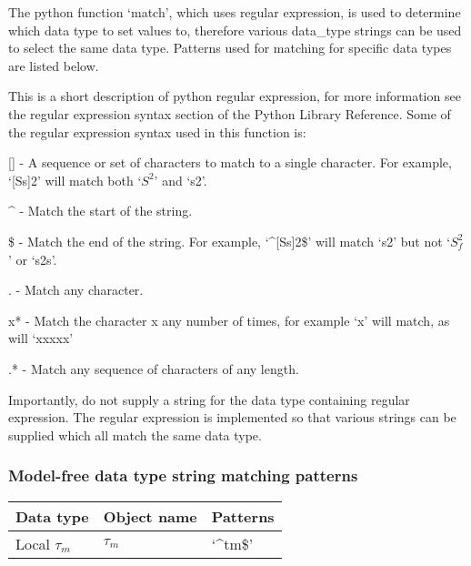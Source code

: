 The python function `match', which uses regular expression, is used to determine which data
type to set values to, therefore various data\_type strings can be used to select the same
data type.  Patterns used for matching for specific data types are listed below.

This is a short description of python regular expression, for more information see the
regular expression syntax section of the Python Library Reference.  Some of the regular
expression syntax used in this function is:

    [] - A sequence or set of characters to match to a single character.  For example,
    `[Ss]2' will match both `$S^2$' and `s2'.

    \^{} - Match the start of the string.

    \$ - Match the end of the string.  For example, `\^{}[Ss]2\$' will match `s2' but not `$S^2_f$'
    or `s2s'.

    . - Match any character.

    x* - Match the character x any number of times, for example `x' will match, as will
    `xxxxx'

    .* - Match any sequence of characters of any length.

Importantly, do not supply a string for the data type containing regular expression.  The
regular expression is implemented so that various strings can be supplied which all match
the same data type.


\subsubsection{Model-free data type string matching patterns}



\begin{center}
\begin{tabular}{lll}
\toprule
Data type & Object name & Patterns \\
\midrule
 Local $\tau_m$                &  $\tau_m$            &  `\^{}tm\$'                                            \\
\bottomrule
\end{tabular}
\end{center}

